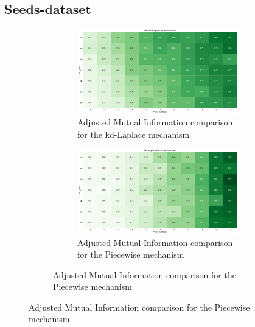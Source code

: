 \subsection{Seeds-dataset}
\begin{figure}[H]
    \centering
    \begin{subfigure}[b]{0.85\textwidth}
        \begin{subfigure}[c]{1\textwidth}
            \includegraphics[width=1\textwidth]{Results/kd-laplace/kd-Laplace/seeds-dataset/ami.png}
            \caption{Adjusted Mutual Information comparison for the kd-Laplace mechanism}
            \label{fig:ami_seeds-dataset_comparison_kdlaplace_2d}
        \end{subfigure}
        \vfill %
        \begin{subfigure}[c]{1\textwidth}
            \includegraphics[width=1\textwidth]{Results/kd-laplace/piecewise/seeds-dataset/ami.png}
            \caption{Adjusted Mutual Information comparison for the Piecewise mechanism}
            \label{fig:ami_seeds-dataset_comparison_piecewise_2d}
        \end{subfigure}
    \end{subfigure}
    \hfill %

\end{figure}
